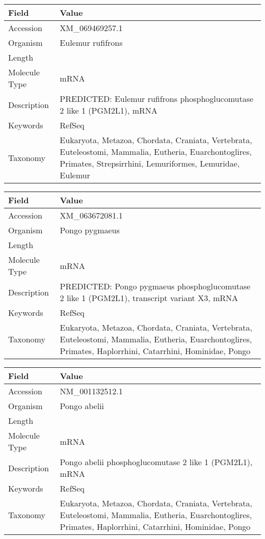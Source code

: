 \documentclass[10pt]{article}
\begin{document}
\vspace{1em}
{\footnotesize
\begin{longtable}{>{\raggedright\arraybackslash}p{4.5cm} >{\raggedright\arraybackslash}p{11.5cm}}
\textbf{Field} & \textbf{Value} \\
\hline
Accession & XM\_069469257.1 \\
Organism & Eulemur rufifrons \\
Length & 1869 \\
Molecule Type & mRNA \\
Description & PREDICTED: Eulemur rufifrons phosphoglucomutase 2 like 1 (PGM2L1), mRNA \\
Keywords & RefSeq \\
Taxonomy & Eukaryota, Metazoa, Chordata, Craniata, Vertebrata, Euteleostomi, Mammalia, Eutheria, Euarchontoglires, Primates, Strepsirrhini, Lemuriformes, Lemuridae, Eulemur \\
\end{longtable}
}

\vspace{1em}
{\footnotesize
\begin{longtable}{>{\raggedright\arraybackslash}p{4.5cm} >{\raggedright\arraybackslash}p{11.5cm}}
\textbf{Field} & \textbf{Value} \\
\hline
Accession & XM\_063672081.1 \\
Organism & Pongo pygmaeus \\
Length & 8280 \\
Molecule Type & mRNA \\
Description & PREDICTED: Pongo pygmaeus phosphoglucomutase 2 like 1 (PGM2L1), transcript variant X3, mRNA \\
Keywords & RefSeq \\
Taxonomy & Eukaryota, Metazoa, Chordata, Craniata, Vertebrata, Euteleostomi, Mammalia, Eutheria, Euarchontoglires, Primates, Haplorrhini, Catarrhini, Hominidae, Pongo \\
\end{longtable}
}

\vspace{1em}
{\footnotesize
\begin{longtable}{>{\raggedright\arraybackslash}p{4.5cm} >{\raggedright\arraybackslash}p{11.5cm}}
\textbf{Field} & \textbf{Value} \\
\hline
Accession & NM\_001132512.1 \\
Organism & Pongo abelii \\
Length & 3912 \\
Molecule Type & mRNA \\
Description & Pongo abelii phosphoglucomutase 2 like 1 (PGM2L1), mRNA \\
Keywords & RefSeq \\
Taxonomy & Eukaryota, Metazoa, Chordata, Craniata, Vertebrata, Euteleostomi, Mammalia, Eutheria, Euarchontoglires, Primates, Haplorrhini, Catarrhini, Hominidae, Pongo \\
\end{longtable}
}
\end{document}
